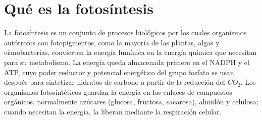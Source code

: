 \documentclass{book}
\begin{document}

\section{Qué es la fotosíntesis}

La fotosíntesis es un conjunto de procesos biológicos por los cuales organismos autótrofos con fotopigmentos, como la mayoría de las plantas, algas y cianobacterias, convierten la energía lumínica en la energía química que necesitan para su metabolismo. La energía queda almacenada primero en el NADPH y el ATP, cuyo poder reductor y potencial energético del grupo fosfato se usan después para sintetizar hidratos de carbono a partir de la reducción del \(CO_{2}\). Los organismos fotosintéticos guardan la energía en los enlaces de compuestos orgánicos, normalmente azúcares (glucosa, fructosa, sacarosa), almidón y celulosa; cuando necesitan la energía, la liberan mediante la respiración celular.

\end{document}
